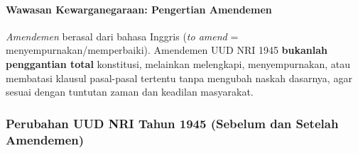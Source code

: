 \paragraph{Wawasan Kewarganegaraan: Pengertian Amendemen}
\textit{Amendemen} berasal dari bahasa Inggris (\textit{to amend} = menyempurnakan/memperbaiki). Amendemen UUD NRI 1945 \textbf{bukanlah penggantian total} konstitusi, melainkan melengkapi, menyempurnakan, atau membatasi klausul pasal-pasal tertentu tanpa mengubah naskah dasarnya, agar sesuai dengan tuntutan zaman dan keadilan masyarakat.

\subsubsection{Perubahan UUD NRI Tahun 1945 (Sebelum dan Setelah Amendemen)}

